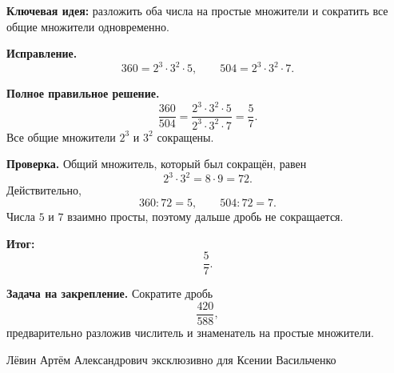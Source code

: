 \documentclass[12pt,a4paper]{article}
\begin{document}
\textcolor{blue!60!black}{\textbf{Ключевая идея:}} разложить оба числа на простые множители и сократить все общие множители одновременно.

\textbf{Исправление.}
\[
360=2^3\cdot3^2\cdot5,
\qquad
504=2^3\cdot3^2\cdot7.
\]

\textbf{Полное правильное решение.}
\[
\frac{360}{504}
=\frac{2^3\cdot3^2\cdot5}{2^3\cdot3^2\cdot7}
=\frac57.
\]
Все общие множители $2^3$ и $3^2$ сокращены.

\textbf{Проверка.}
Общий множитель, который был сокращён, равен
\[
2^3\cdot3^2=8\cdot9=72.
\]
Действительно,
\[
360:72=5,
\qquad
504:72=7.
\]
Числа $5$ и $7$ взаимно просты, поэтому дальше дробь не сокращается.

\textcolor{teal!60!black}{\textbf{Итог:}}
\[
\boxed{\frac57}.
\]

\textbf{Задача на закрепление.}
Сократите дробь
\[
\frac{420}{588},
\]
предварительно разложив числитель и знаменатель на простые множители.

\vfill
\begin{center}
\small Лёвин Артём Александрович эксклюзивно для Ксении Васильченко
\end{center}
\end{document}
